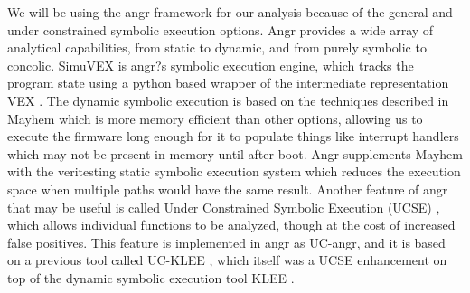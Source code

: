 \documentclass[letterpaper, 10 pt, conference]{ieeeconf}
\begin{document}
We will be using the angr framework \cite{angr} for our analysis because of the general and under constrained symbolic execution options. Angr provides a wide array of analytical capabilities, from static to dynamic, and from purely symbolic to concolic. SimuVEX is angr?s symbolic execution engine, which tracks the program state using a python based wrapper \cite{pyvex} of the intermediate representation VEX \cite{vex}. The dynamic symbolic execution is based on the techniques described in Mayhem \cite{mayhem} which is more memory efficient than other options, allowing us to execute the firmware long enough for it to populate things like interrupt handlers which may not be present in memory until after boot. Angr supplements Mayhem with the veritesting static symbolic execution system \cite{veritesting} which reduces the execution space when multiple paths would have the same result. Another feature of angr that may be useful is called Under Constrained Symbolic Execution (UCSE) \cite{ucklee2}, which allows individual functions to be analyzed, though at the cost of increased false positives. This feature is implemented in angr as UC-angr, and it is based on a previous tool called UC-KLEE \cite{ucklee1}, which itself was a UCSE enhancement on top of the dynamic symbolic execution tool KLEE \cite{klee}.

{}

\end{document}
